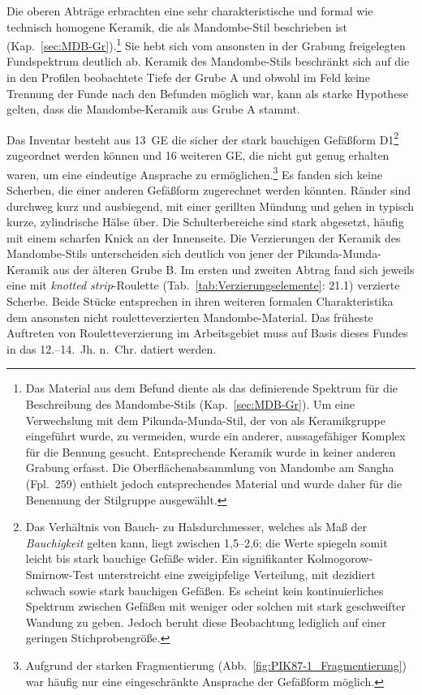 \vspace{1em}
\noindent Die oberen Abträge erbrachten eine sehr charakteristische und formal wie technisch homogene Keramik, die als Mandombe-Stil beschrieben ist (Kap.~\ref{sec:MDB-Gr}).\footnote{Das Material aus dem Befund diente als das definierende Spektrum für die Beschreibung des Mandombe-Stils (Kap.~\ref{sec:MDB-Gr}). Um eine Verwechslung mit dem Pikunda-Munda-Stil, der von \textcite{Eggert.1992} als Keramikgruppe eingeführt wurde, zu vermeiden, wurde ein anderer, aussagefähiger Komplex für die Bennung gesucht. Entsprechende Keramik wurde in keiner anderen Grabung erfasst. Die Oberflächenabsammlung von Mandombe am \mbox{Sangha} (Fpl.~259) enthielt jedoch entsprechendes Material und wurde daher für die Benennung der Stilgruppe ausgewählt.} Sie hebt sich vom ansonsten in der Grabung freigelegten Fundspektrum deutlich ab. Keramik des Mandombe-Stils beschränkt sich auf die in den Profilen beobachtete Tiefe der Grube A und obwohl im Feld keine Trennung der Funde nach den Befunden möglich war, kann als starke Hypothese gelten, dass die Mandombe-Keramik aus Grube A stammt.

Das Inventar besteht aus 13~GE die sicher der stark bauchigen Gefäßform D1\footnote{Das Verhältnis von Bauch- zu Halsdurchmesser, welches als Maß der \textit{Bauchigkeit} gelten kann, liegt zwischen 1,5--2,6; die Werte spiegeln somit leicht bis stark bauchige Gefäße wider. Ein signifikanter Kolmogorow-Smirnow-Test unterstreicht eine zweigipfelige Verteilung, mit dezidiert schwach sowie stark bauchigen Gefäßen. Es scheint kein kontinuierliches Spektrum zwischen Gefäßen mit weniger oder solchen mit stark geschweifter Wandung zu geben. Jedoch beruht diese Beobachtung lediglich auf einer geringen Stichprobengröße.} zugeordnet werden können und 16 weiteren GE, die nicht gut genug erhalten waren, um eine eindeutige Ansprache zu ermöglichen.\footnote{Aufgrund der starken Fragmentierung (Abb.~\ref{fig:PIK87-1_Fragmentierung}) war häufig nur eine eingeschränkte Ansprache der Gefäßform möglich.} Es fanden sich keine Scherben, die einer anderen Gefäßform zugerechnet werden könnten. Ränder sind durchweg kurz und ausbiegend, mit einer gerillten Mündung und gehen in typisch kurze, zylindrische Hälse über. Die Schulterbereiche sind stark abgesetzt, häufig mit einem scharfen Knick an der Innenseite. Die Verzierungen der Keramik des Mandombe-Stils unterscheiden sich deutlich von jener der Pikunda-Munda-Keramik aus der älteren Grube B. Im ersten und zweiten Abtrag fand sich jeweils eine mit \textit{knotted strip}-Roulette (Tab.~\ref{tab:Verzierungselemente}: 21.1) verzierte Scherbe. Beide Stücke entsprechen in ihren weiteren formalen Charakteristika dem ansonsten nicht rouletteverzierten Mandombe-Material. Das früheste Auftreten von Rouletteverzierung im Arbeitsgebiet muss auf Basis dieses Fundes in das 12.--14.~Jh. n.~Chr. datiert werden.

